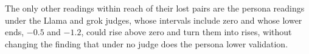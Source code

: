 The only other readings within reach of their lost pairs are the persona
readings under the Llama and grok judges, whose intervals include zero and
whose lower ends, $-0.5$ and $-1.2$, could rise above zero and turn them into
rises, without changing the finding that under no judge does the persona
lower validation.

